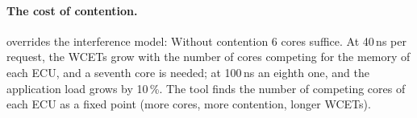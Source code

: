 \paragraph{The cost of contention.}  overrides the
interference model:
Without contention 6 cores suffice. At 40\,ns per request, the WCETs grow
with the number of cores competing for the memory of each ECU, and a
seventh core is needed; at 100\,ns an eighth one, and the application
load grows by 10\,\%. The tool finds the number of competing cores of
each ECU as a fixed point (more cores, more contention, longer WCETs).
